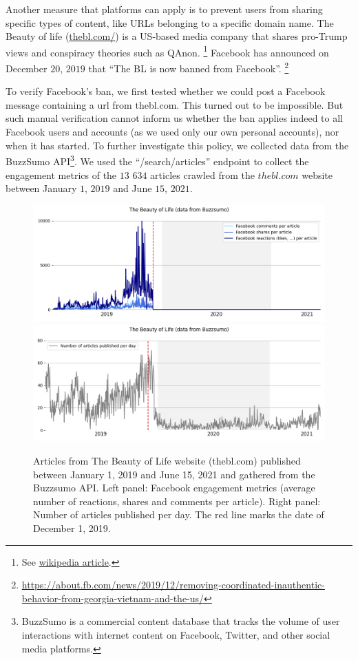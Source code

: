 \documentclass{article}
\begin{document}
Another measure that platforms can apply is to prevent users from sharing specific types of content, like URLs belonging to a specific domain name.  
The Beauty of life (\href{https://thebl.com/}{thebl.com/}) is a US-based media company that shares pro-Trump views and conspiracy theories such as QAnon.
\footnote{ See \href{https://en.wikipedia.org/wiki/The\_Epoch\_Times\#Removal\_of\_The\_BL\_(The\_Beauty\_of\_Life)\_from\_Facebook}{wikipedia article}.} 
Facebook has announced on December $20$, $2019$ that ``The BL is now banned from Facebook''.
\footnote{\url{https://about.fb.com/news/2019/12/removing-coordinated-inauthentic-behavior-from-georgia-vietnam-and-the-us/}}

To verify Facebook’s ban, we first tested whether we could post a Facebook message containing a url from thebl.com. This turned out to be impossible. But such manual verification cannot inform us whether the ban applies indeed to all Facebook users and accounts (as we used only our own personal accounts), nor when it has started. To further investigate this policy, we collected data from the BuzzSumo API\footnote{BuzzSumo is a commercial content database that tracks the volume of user interactions with internet content on Facebook, Twitter, and other social media platforms.}. We used the ``/search/articles'' endpoint to collect the engagement metrics of the $13$ $634$ articles crawled from the $thebl.com$ website between January $1$, $2019$ and June $15$, $2021$.

\begin{figure}[h]
\hspace{-2em}
		\includegraphics[scale=0.32]{../figure/facebook_buzzsumo_thebl_1.png}
		\includegraphics[scale=0.32]{../figure/facebook_buzzsumo_thebl_2.png} 
	\caption{Articles from The Beauty of Life website (thebl.com) published between January 1, 2019 and June 15, 2021 and gathered from the Buzzsumo API. Left panel: Facebook engagement metrics (average number of reactions, shares and comments per article). Right panel: Number of articles published per day. The red line marks the date of December 1, 2019. }
	\label{fb_bl}
\end{figure}
\end{document}
